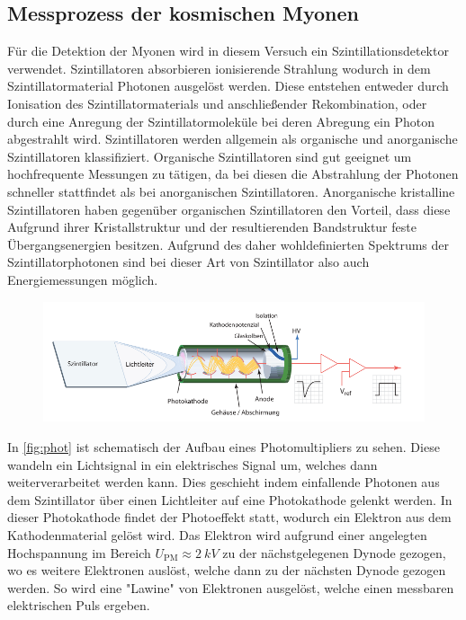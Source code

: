 \subsection{Messprozess der kosmischen Myonen}
Für die Detektion der Myonen wird in diesem Versuch ein Szintillationsdetektor verwendet. Szintillatoren absorbieren ionisierende Strahlung wodurch in dem Szintillatormaterial Photonen ausgelöst werden. Diese entstehen entweder durch Ionisation des Szintillatormaterials und anschließender Rekombination, oder 
durch eine Anregung der Szintillatormoleküle bei deren Abregung ein Photon abgestrahlt wird. Szintillatoren werden allgemein als organische und anorganische Szintillatoren klassifiziert. Organische Szintillatoren sind gut geeignet um hochfrequente Messungen zu tätigen, da bei diesen die Abstrahlung der Photonen schneller stattfindet als bei anorganischen Szintillatoren. Anorganische kristalline Szintillatoren haben gegenüber organischen Szintillatoren den Vorteil, dass diese Aufgrund ihrer Kristallstruktur und der resultierenden Bandstruktur feste Übergangsenergien besitzen. Aufgrund des daher wohldefinierten Spektrums der Szintillatorphotonen sind bei dieser Art von Szintillator also auch Energiemessungen möglich. 

\begin{figure}[H]
    \centering
    \includegraphics[width=0.8\linewidth]{data/photomult.png}
    \label{fig:phot}
\end{figure}
\noindent
In \autoref{fig:phot} ist schematisch der Aufbau eines Photomultipliers zu sehen. Diese wandeln ein Lichtsignal in ein elektrisches Signal um, welches dann weiterverarbeitet werden kann. Dies geschieht indem einfallende Photonen aus dem Szintillator über einen Lichtleiter auf eine Photokathode gelenkt werden. In dieser Photokathode findet der
Photoeffekt statt, wodurch ein Elektron aus dem Kathodenmaterial gelöst wird. Das Elektron wird aufgrund einer angelegten Hochspannung im Bereich $U_{\text{PM}} \approx \SI{2}{kV}$ zu der nächstgelegenen Dynode gezogen, wo es weitere Elektronen auslöst, welche dann zu der nächsten Dynode gezogen werden. So wird eine "Lawine" von Elektronen ausgelöst, welche einen messbaren elektrischen Puls ergeben.
\newpage

